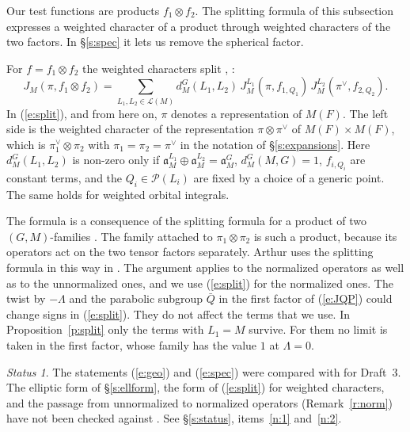 \documentclass[12pt,letterpaper]{article}
\numberwithin{equation}{section}
\theoremstyle{plain}
\theoremstyle{definition}
\theoremstyle{remark}
\newtheorem{status}[theorem]{Status}
\newcommand{\cP}{\mathcal{P}}
\newcommand{\cL}{\mathcal{L}}
\newcommand{\fa}{\mathfrak{a}}
\begin{document}
Our test functions are products $f_1\otimes f_2$. The splitting formula of this subsection expresses a weighted character of a product through weighted characters of the two factors. In \S\ref{s:spec} it lets us remove the spherical factor.

For $f=f_1\otimes f_2$ the weighted characters split \cite[Cor.~7.4]{Ar88}, \cite[\S10]{Ar91}:
\begin{equation}\label{e:split}
J_M(\pi,f_1\otimes f_2)=\sum_{L_1,L_2\in\cL(M)}d_M^G(L_1,L_2)\,J^{L_1}_M(\pi,f_{1,Q_1})\,J^{L_2}_M(\pi^\vee,f_{2,Q_2}).
\end{equation}
In (\ref{e:split}), and from here on, $\pi$ denotes a representation of $M(F)$. The left side is the weighted character of the representation $\pi\otimes\pi^\vee$ of $M(F)\times M(F)$, which is $\pi_1^\vee\otimes\pi_2$ with $\pi_1=\pi_2=\pi^\vee$ in the notation of \S\ref{s:expansions}. Here $d_M^G(L_1,L_2)$ is non-zero only if $\fa_M^{L_1}\oplus\fa_M^{L_2}=\fa_M^G$, $d_M^G(M,G)=1$, $f_{i,Q_i}$ are constant terms, and the $Q_i\in\cP(L_i)$ are fixed by a choice of a generic point. The same holds for weighted orbital integrals.

The formula is a consequence of the splitting formula for a product of two $(G,M)$-families \cite[Cor.~7.4]{Ar88}. The family attached to $\pi_1\otimes\pi_2$ is such a product, because its operators act on the two tensor factors separately. Arthur uses the splitting formula in this way in \cite[\S10]{Ar91}. The argument applies to the normalized operators as well as to the unnormalized ones, and we use (\ref{e:split}) for the normalized ones. The twist by $-\Lambda$ and the parabolic subgroup $\bar Q$ in the first factor of (\ref{e:JQP}) could change signs in (\ref{e:split}). They do not affect the terms that we use. In Proposition~\ref{p:split} only the terms with $L_1=M$ survive. For them no limit is taken in the first factor, whose family has the value $1$ at $\Lambda=0$.

\begin{status}
The statements (\ref{e:geo}) and (\ref{e:spec}) were compared with \cite[Thm.~12.2]{Ar91} for Draft~3. The elliptic form of \S\ref{s:ellform}, the form of (\ref{e:split}) for weighted characters, and the passage from unnormalized to normalized operators (Remark~\ref{r:norm}) have not been checked against \cite{Ar88,Ar93}. See \S\ref{s:status}, items~\ref{n:1} and~\ref{n:2}.
\end{status}

\end{document}
